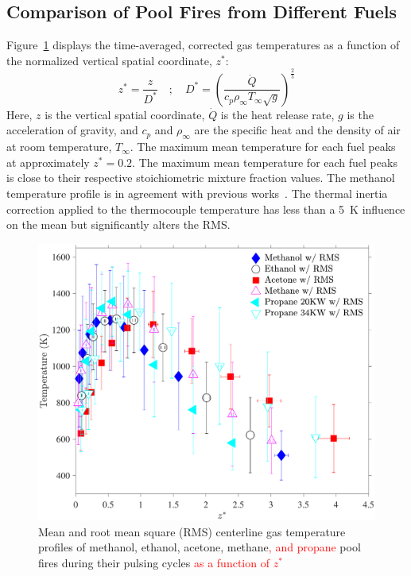 \documentclass[12pt]{article}
\begin{document}
\subsection{Comparison of Pool Fires from Different Fuels}
\label{ssec:Fuel_comp}

Figure~\ref{fig:Temp_Comparison} displays the time-averaged, corrected gas temperatures as a function of the normalized vertical spatial coordinate, $z^*$:
\begin{equation}\label{eq:Z_Star}
z^*=\frac{z}{D^*}  \quad ; \quad  D^* = \left(\frac{\dot{Q}}{c_{p}\rho_\infty T_\infty \sqrt{g}}\right)^{\frac{2}{5}}
\end{equation}
Here, $z$ is the vertical spatial coordinate, $\dot{Q}$ is the heat release rate, $g$ is the acceleration of gravity, and $c_p$ and $\rho_\infty$ are the specific heat and the density of air at room temperature, $T_\infty$. The maximum mean temperature for each fuel peaks at approximately $z^*=0.2$. The maximum mean temperature for each fuel peaks is close to their respective stoichiometric mixture fraction values. The methanol temperature profile is in agreement with previous works~\cite{Wang2019}. The thermal inertia correction applied to the thermocouple temperature has less than a 5~K influence on the mean but significantly alters the RMS. 

\begin{figure}[h!]
	\centering
\includegraphics[width=10.0 cm, keepaspectratio]{Temperature_Comparison.pdf}
	\caption[Mean and RMS centerline gas temperature profiles]{Mean and root mean square (RMS) centerline gas temperature profiles of methanol, ethanol, acetone, methane\textcolor{red}{, and propane} pool fires during their pulsing cycles \textcolor{red}{ as a function of $z^*$}}
	\label{fig:Temp_Comparison}
\end{figure}
\end{document}
